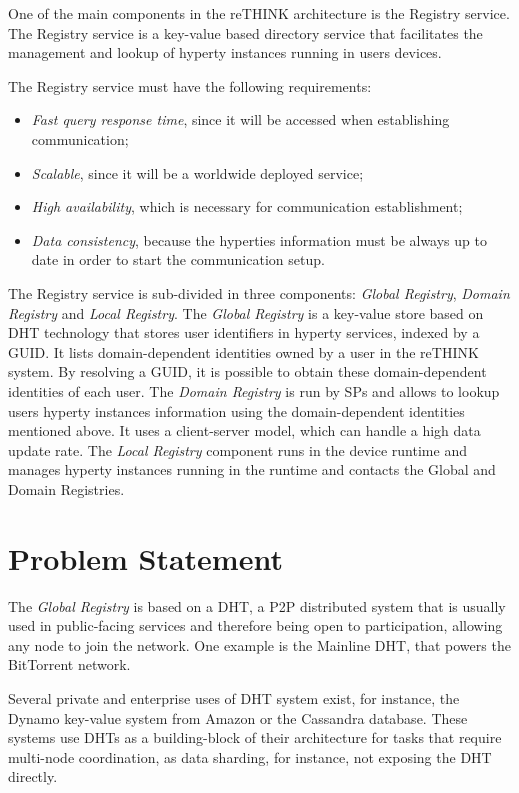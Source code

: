 One of the main components in the reTHINK architecture is the Registry service.
The Registry service is a key-value based directory service that facilitates the management and lookup of hyperty instances running in users devices.

The Registry service must have the following requirements:
\begin{itemize}
  \item \textit{Fast query response time}, since it will be accessed when establishing communication;
	\item \textit{Scalable}, since it will be a worldwide deployed service;
  \item \textit{High availability}, which is necessary for communication establishment;
  \item \textit{Data consistency}, because the hyperties information must be always up to date in order to start the communication setup.
\end{itemize}

The Registry service is sub-divided in three components: \textit{Global Registry}, \textit{Domain Registry} and \textit{Local Registry}.
The \textit{Global Registry} is a key-value store based on \ac{DHT} technology that stores user identifiers in hyperty services, indexed by a \ac{GUID}.
It lists domain-dependent identities owned by a user in the reTHINK system.
By resolving a \ac{GUID}, it is possible to obtain these domain-dependent identities of each user.
The \textit{Domain Registry} is run by \acp{SP} and allows to lookup users hyperty instances information using the domain-dependent identities mentioned above.
It uses a client-server model, which can handle a high data update rate.
The \textit{Local Registry} component runs in the device runtime and manages hyperty instances running in the runtime and contacts the Global and Domain Registries.

\section{Problem Statement}
\label{section:problem-statement}

The \textit{Global Registry} is based on a \ac{DHT}, a \ac{P2P} distributed system  that is usually used in public-facing services and therefore being open to participation, allowing any node to join the network.
One example is the Mainline \ac{DHT}, that powers the BitTorrent network.

Several private and enterprise uses of DHT system exist, for instance, the Dynamo\cite{dynamo2007} key-value system from Amazon or the Cassandra\cite{cassandra2010} database.
These systems use \acp{DHT} as a building-block of their architecture for tasks that require multi-node coordination, as data sharding, for instance, not exposing the \ac{DHT} directly.

